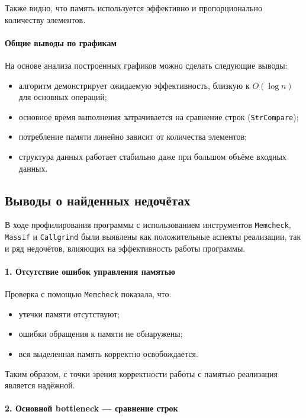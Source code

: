 \documentclass[12pt]{article}
\begin{document}
Также видно, что память используется эффективно и пропорционально количеству элементов.

\paragraph{Общие выводы по графикам}

На основе анализа построенных графиков можно сделать следующие выводы:
\begin{itemize}
	\item алгоритм демонстрирует ожидаемую эффективность, близкую к $O(\log n)$ для основных операций;
	\item основное время выполнения затрачивается на сравнение строк (\texttt{StrCompare});
	\item потребление памяти линейно зависит от количества элементов;
	\item структура данных работает стабильно даже при большом объёме входных данных.
\end{itemize}

\subsection*{Выводы о найденных недочётах}

 
 В ходе профилирования программы с использованием инструментов \texttt{Memcheck}, \texttt{Massif} и \texttt{Callgrind} были выявлены как положительные аспекты реализации, так и ряд недочётов, влияющих на эффективность работы программы.
 
 \paragraph{1. Отсутствие ошибок управления памятью}
 
 Проверка с помощью \texttt{Memcheck} показала, что:
 \begin{itemize}
 	\item утечки памяти отсутствуют;
 	\item ошибки обращения к памяти не обнаружены;
 	\item вся выделенная память корректно освобождается.
 \end{itemize}
 
 Таким образом, с точки зрения корректности работы с памятью реализация является надёжной.
 
 \paragraph{2. Основной bottleneck — сравнение строк}
 
\end{document}
